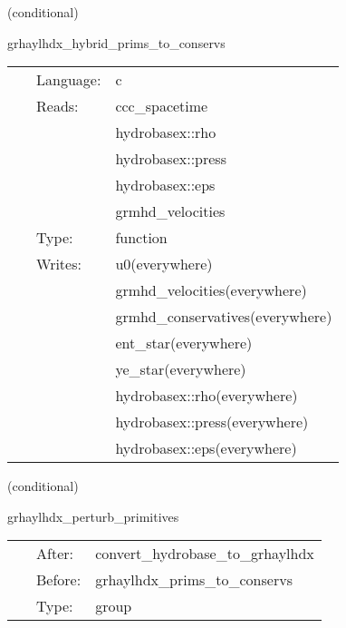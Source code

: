\documentclass{article}
\begin{document}
\vspace{5mm}

   (conditional) 

\hspace{5mm} grhaylhdx\_hybrid\_prims\_to\_conservs 

\hspace{5mm}{\it hybrid version of grhaylhdx\_prims\_to\_conservs } 


\hspace{5mm}

 \begin{tabular*}{160mm}{cll} 
~ & Language:  & c \\ 
~ & Reads:  & ccc\_spacetime \\ 
~& ~ &hydrobasex::rho\\ 
~& ~ &hydrobasex::press\\ 
~& ~ &hydrobasex::eps\\ 
~& ~ &grmhd\_velocities\\ 
~ & Type:  & function \\ 
~ & Writes:  & u0(everywhere) \\ 
~& ~ &grmhd\_velocities(everywhere)\\ 
~& ~ &grmhd\_conservatives(everywhere)\\ 
~& ~ &ent\_star(everywhere)\\ 
~& ~ &ye\_star(everywhere)\\ 
~& ~ &hydrobasex::rho(everywhere)\\ 
~& ~ &hydrobasex::press(everywhere)\\ 
~& ~ &hydrobasex::eps(everywhere)\\ 
\end{tabular*} 


\vspace{5mm}

   (conditional) 

\hspace{5mm} grhaylhdx\_perturb\_primitives 

\hspace{5mm}{\it perturb initial primitive data } 


\hspace{5mm}

 \begin{tabular*}{160mm}{cll} 
~ & After:  & convert\_hydrobase\_to\_grhaylhdx \\ 
~ & Before:  & grhaylhdx\_prims\_to\_conservs \\ 
~ & Type:  & group \\ 
\end{tabular*} 
\end{document}
